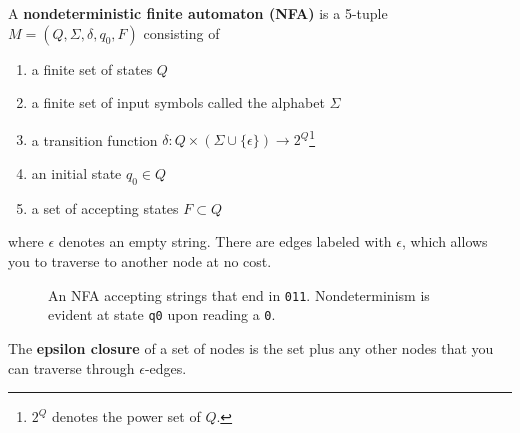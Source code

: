   \begin{definition}
    A \textbf{nondeterministic finite automaton (NFA)} is a 5-tuple $M = (Q, \Sigma, \delta, q_0, F)$ consisting of 
    \begin{enumerate}
      \item a finite set of states $Q$
      \item a finite set of input symbols called the alphabet $\Sigma$
      \item a transition function $\delta: Q \times (\Sigma \cup \{\epsilon\}) \to 2^Q$\footnote{$2^Q$ denotes the power set of $Q$.}
      \item an initial state $q_0 \in Q$ 
      \item a set of accepting states $F \subset Q$
    \end{enumerate}
    where $\epsilon$ denotes an empty string. There are edges labeled with $\epsilon$, which allows you to traverse to another node at no cost. 

    \begin{figure}[H]
      \centering
      \caption{An NFA accepting strings that end in \texttt{011}. Nondeterminism is evident at state \texttt{q0} upon reading a \texttt{0}.}
      \label{fig:nfa_endswith011}
    \end{figure}

    The \textbf{epsilon closure} of a set of nodes is the set plus any other nodes that you can traverse through $\epsilon$-edges. 
  \end{definition} 

